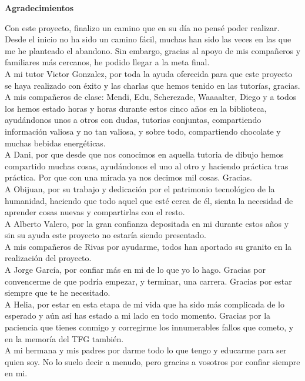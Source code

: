 \newpage{}
\thispagestyle{empty}
\begin{center}
    \Large
    \vspace{0.9cm}
    \textbf{Agradecimientos}
\end{center}

Con este proyecto, finalizo un camino que en su día no pensé poder realizar. Desde el inicio no ha sido un camino fácil, muchas han sido las veces en las que me he planteado el abandono. Sin embargo, gracias al apoyo de mis compañeros y familiares más cercanos, he podido llegar a la meta final.\\

A mi tutor Victor Gonzalez, por toda la ayuda oferecida para que este proyecto se haya realizado con éxito y las charlas que hemos tenido en las tutorías, gracias.\\

A mis compañeros de clase: Mendi, Edu, Scherezade, Waaaalter, Diego y a todos los hemos estado horas y horas durante estos cinco años en la biblioteca, ayudándonos unos a otros con dudas, tutorias conjuntas, compartiendo información valiosa y no tan valiosa, y sobre todo, compartiendo chocolate y muchas bebidas energéticas. \\

A Dani, por que desde que nos conocimos en aquella tutoria de dibujo hemos compartido muchas cosas, ayudándonos el uno al otro y haciendo práctica tras práctica. Por que con una mirada ya nos decimos mil cosas. Gracias.\\

A Obijuan, por su trabajo y dedicación por el patrimonio tecnológico de la humanidad, haciendo que todo aquel que esté cerca de él, sienta la necesidad de aprender cosas nuevas y compartirlas con el resto.\\

A Alberto Valero, por la gran confianza depositada en mi durante estos años y sin su ayuda este proyecto no estaría siendo presentado.\\

A mis compañeros de Rivas por ayudarme, todos han aportado su granito en la realización del proyecto.\\

A Jorge García, por confiar más en mi de lo que yo lo hago. Gracias por convencerme de que podría empezar, y terminar, una carrera. Gracias por estar siempre que te he necesitado.\\

A Helia, por estar en esta etapa de mi vida que ha sido más complicada de lo esperado y aún así has estado a mi lado en todo momento. Gracias por la paciencia que tienes conmigo y corregirme los innumerables fallos que cometo, y en la memoría del TFG también.\\

A mi hermana y mis padres por darme todo lo que tengo y educarme para ser quien soy. No lo suelo decir a menudo, pero gracias a vosotros por confiar siempre en mi.